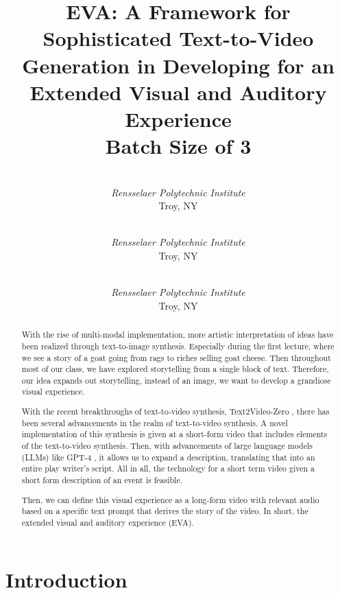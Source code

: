 \documentclass[conference]{IEEEtran}
\begin{document}
\title{EVA: A Framework for Sophisticated Text-to-Video Generation in Developing for an Extended Visual and Auditory Experience \\
{\footnotesize Batch Size of 3}
}

\author{\\
\textit{Rensselaer Polytechnic Institute}\\
Troy, NY
\and
{}\\
\textit{Rensselaer Polytechnic Institute}\\
Troy, NY
\and
{}\\
\textit{Rensselaer Polytechnic Institute}\\
Troy, NY
}

\maketitle

\begin{abstract}

With the rise of multi-modal implementation, more artistic interpretation of ideas have been realized through text-to-image synthesis. Especially during the first lecture, where we see a story of a goat going from rags to riches selling goat cheese. Then throughout most of our class, we have explored storytelling from a single block of text. Therefore, our idea expands out storytelling, instead of an image, we want to develop a grandiose visual experience. 

With the recent breakthroughs of text-to-video synthesis, Text2Video-Zero \cite{text2vid}, there has been several advancements in the realm of text-to-video synthesis. A novel implementation of this synthesis is given at a short-form video that includes elements of the text-to-video synthesis. Then, with advancements of large language models (LLMs) like GPT-4 \cite{gpt4}, it allows us to expand a description, translating that into an entire play writer's script. All in all, the technology for a short term video given a short form description of an event is feasible.

Then, we can define this visual experience as a long-form video with relevant audio based on a specific text prompt that derives the story of the video. In short, the extended visual and auditory experience (EVA). 

\end{abstract}

\section{Introduction}
\end{document}
